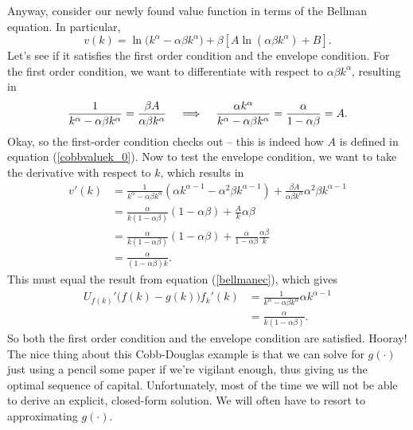\documentclass[12pt]{article}
\newcommand{\Lindent}{\hspace{.4cm} \Longrightarrow \hspace{.4cm}}
\theoremstyle{definition}
\begin{document}
Anyway, consider our newly found value function in terms of the Bellman equation. In particular,
\begin{equation}
	v(k) = \ln\big( k^{\alpha} - \alpha \beta k^{\alpha} \big) + \beta \left[ A \ln(\alpha \beta k^{\alpha}) + B \right ]. \label{cobbbellman}
\end{equation}
Let's see if it satisfies the first order condition and the envelope condition. For the first order condition, we want to differentiate with respect to $\alpha \beta k^{\alpha}$, resulting in
\[ \frac{1}{k^{\alpha} - \alpha \beta k^{\alpha}} = \frac{\beta A}{\alpha \beta k^{\alpha}} \Lindent \frac{\alpha k^{\alpha}}{k^{\alpha} - \alpha \beta k^{\alpha}} = \frac{\alpha}{1 - \alpha \beta } =A.	\]
Okay, so the first-order condition checks out -- this is indeed how $A$ is defined in equation (\ref{cobbvaluek_0}). Now to test the envelope condition, we want to take the derivative with respect to $k$, which results in
\begin{align*}	
	v'(k) &= \frac{1}{k^{\alpha} - \alpha \beta k^{\alpha}}(\alpha k^{\alpha - 1} - \alpha^2 \beta k^{\alpha - 1}) + \frac{\beta A}{\alpha \beta k^{\alpha}}\alpha^2 \beta k^{\alpha - 1}	\\
	& = \frac{\alpha}{k(1 - \alpha \beta) }(1 - \alpha \beta ) + \frac{ A}{k}\alpha \beta \\
	& = \frac{\alpha}{k(1 - \alpha \beta) }(1 - \alpha \beta ) + \frac{\alpha}{1 - \alpha \beta }\frac{\alpha \beta}{k} \\
	&= \frac{\alpha}{(1 - \alpha \beta)k}.
\end{align*}
This must equal the result from equation (\ref{bellmanec}), which gives
\begin{align*}
	U_{f(k)}'\big( f(k)-g(k)\big)f_k'(k) 	&= \frac{1}{k^{\alpha} - \alpha \beta k^{\alpha}} \alpha k^{\alpha - 1}\\
	&= \frac{\alpha}{k(1 - \alpha \beta) }.
\end{align*}
So both the first order condition and the envelope condition are satisfied. Hooray!\\

The nice thing about this Cobb-Douglas example is that we can solve for $g(\cdot)$ just using a pencil some paper if we're vigilant enough, thus giving us the optimal sequence of capital. Unfortunately, most of the time we will not be able to derive an explicit, closed-form solution. We will often have to resort to approximating $g(\cdot)$. 
\end{document}
